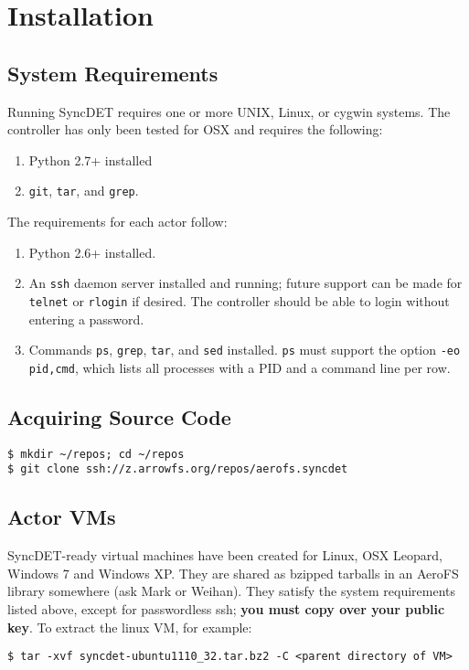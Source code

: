 \section{Installation}

\subsection{System Requirements}

Running SyncDET requires one or more UNIX, Linux, or cygwin systems. 
The controller has only been tested for OSX and requires the
following:
\begin{enumerate}
\item Python 2.7+ installed
\item {\tt git}, {\tt tar}, and {\tt grep}.
\end{enumerate}
The requirements for each actor follow:
\begin{enumerate}
\item Python 2.6+ installed.
\item An {\tt ssh} daemon server installed and running; future support can be made for
{\tt telnet} or {\tt rlogin} if desired. The controller should be able to login
without entering a password.
\item Commands {\tt ps}, {\tt grep}, {\tt tar}, and {\tt sed} installed. {\tt ps} must
support the option {\tt -eo pid,cmd}, which lists all processes with a PID and a
command line per row.
\end{enumerate}

\subsection{Acquiring Source Code}
\begin{verbatim}
$ mkdir ~/repos; cd ~/repos
$ git clone ssh://z.arrowfs.org/repos/aerofs.syncdet
\end{verbatim}

\subsection{Actor VMs}
SyncDET-ready virtual machines have been created for Linux, OSX Leopard, Windows
7 and Windows XP. They are shared as bzipped tarballs in an AeroFS library
somewhere (ask Mark or Weihan). They satisfy the system requirements listed
above, except for passwordless ssh; {\bf you must copy over your public key}. To
extract the linux VM, for example:
\begin{verbatim}
$ tar -xvf syncdet-ubuntu1110_32.tar.bz2 -C <parent directory of VM>
\end{verbatim}

